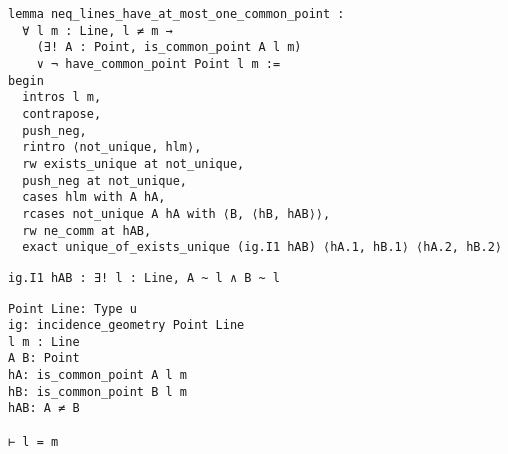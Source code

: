 










\begin{frame}[fragile]
	\begin{multicols}{2}
		\begin{lstlisting}
lemma neq_lines_have_at_most_one_common_point :
  ∀ l m : Line, l ≠ m → 
    (∃! A : Point, is_common_point A l m) 
    ∨ ¬ have_common_point Point l m := 
begin
  intros l m,
  contrapose,
  push_neg,
  rintro ⟨not_unique, hlm⟩,
  rw exists_unique at not_unique,
  push_neg at not_unique,
  cases hlm with A hA,
  rcases not_unique A hA with ⟨B, ⟨hB, hAB⟩⟩,
  rw ne_comm at hAB,
  exact unique_of_exists_unique (ig.I1 hAB) ⟨hA.1, hB.1⟩ ⟨hA.2, hB.2⟩
\end{lstlisting}
		\vspace{1em}
		\begin{lstlisting}
ig.I1 hAB : ∃! l : Line, A ~ l ∧ B ~ l
\end{lstlisting}
		\columnbreak
		\begin{lstlisting}
Point Line: Type u
ig: incidence_geometry Point Line
l m : Line
A B: Point
hA: is_common_point A l m
hB: is_common_point B l m
hAB: A ≠ B

⊢ l = m
\end{lstlisting}
	\end{multicols}
\end{frame}










